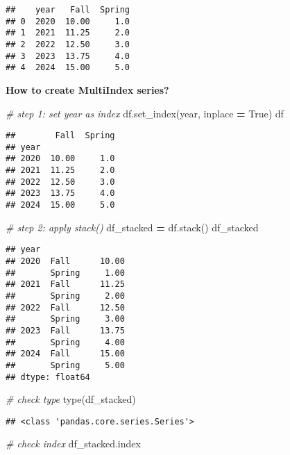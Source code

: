 \documentclass[
]{book}
\newenvironment{Shaded}{\begin{snugshade}}{\end{snugshade}}
\newcommand{\BuiltInTok}[1]{#1}
\newcommand{\CommentTok}[1]{\textcolor[rgb]{0.56,0.35,0.01}{\textit{#1}}}
\newcommand{\NormalTok}[1]{#1}
\newcommand{\OperatorTok}[1]{\textcolor[rgb]{0.81,0.36,0.00}{\textbf{#1}}}
\newcommand{\StringTok}[1]{\textcolor[rgb]{0.31,0.60,0.02}{#1}}
\newcommand{\VariableTok}[1]{\textcolor[rgb]{0.00,0.00,0.00}{#1}}
\begin{document}
\begin{verbatim}
##    year   Fall  Spring
## 0  2020  10.00     1.0
## 1  2021  11.25     2.0
## 2  2022  12.50     3.0
## 3  2023  13.75     4.0
## 4  2024  15.00     5.0
\end{verbatim}

\textbf{How to create MultiIndex series?}

\begin{Shaded}
\begin{Highlighting}[]
\CommentTok{\# step 1: set year as index}
\NormalTok{df.set\_index(}\StringTok{\textquotesingle{}year\textquotesingle{}}\NormalTok{, inplace }\OperatorTok{=} \VariableTok{True}\NormalTok{)}
\NormalTok{df}
\end{Highlighting}
\end{Shaded}

\begin{verbatim}
##        Fall  Spring
## year               
## 2020  10.00     1.0
## 2021  11.25     2.0
## 2022  12.50     3.0
## 2023  13.75     4.0
## 2024  15.00     5.0
\end{verbatim}

\begin{Shaded}
\begin{Highlighting}[]
\CommentTok{\# step 2: apply stack()}
\NormalTok{df\_stacked }\OperatorTok{=}\NormalTok{ df.stack()}
\NormalTok{df\_stacked}
\end{Highlighting}
\end{Shaded}

\begin{verbatim}
## year        
## 2020  Fall      10.00
##       Spring     1.00
## 2021  Fall      11.25
##       Spring     2.00
## 2022  Fall      12.50
##       Spring     3.00
## 2023  Fall      13.75
##       Spring     4.00
## 2024  Fall      15.00
##       Spring     5.00
## dtype: float64
\end{verbatim}

\begin{Shaded}
\begin{Highlighting}[]
\CommentTok{\# check type}
\BuiltInTok{type}\NormalTok{(df\_stacked)}
\end{Highlighting}
\end{Shaded}

\begin{verbatim}
## <class 'pandas.core.series.Series'>
\end{verbatim}

\begin{Shaded}
\begin{Highlighting}[]
\CommentTok{\# check index}
\NormalTok{df\_stacked.index}
\end{Highlighting}
\end{Shaded}
\end{document}
